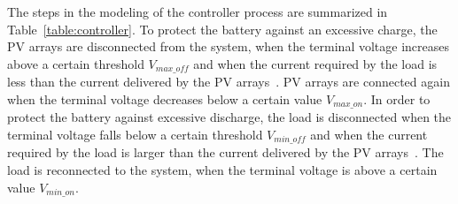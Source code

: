 \documentclass[review]{elsarticle}
\begin{document}
The steps in the modeling of the controller process are summarized in Table~\ref{table:controller}. To protect the battery against an excessive charge, the PV arrays are disconnected from the system, when the terminal voltage increases above a certain threshold $V_{max \_ off}$ and when the current required by the load is less than the current delivered by the PV arrays~\citep{Hansen}. PV arrays are connected again when the terminal voltage decreases below a certain value $ V_{max \_ on} $. 
%
%
In order to protect the battery against excessive discharge, the load is disconnected when the terminal voltage falls below a certain threshold $V_{min \_ off}$ and when the current required by the load is larger than the current delivered by the PV arrays~\citep{Hansen}. The load is reconnected to the system, when the terminal voltage is above a certain value $V_{min \_ on}$.
%
%
%
\end{document}
